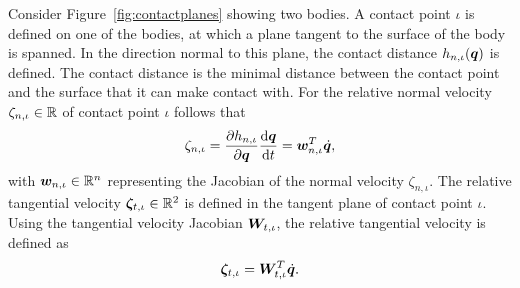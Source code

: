 \documentclass[../DC2017114Bouma.tex]{subfiles}
\begin{document}
Consider Figure~\ref{fig:contactplanes} showing two bodies. A contact point $\iota$ is defined on one of the bodies, at which a plane tangent to the surface of the body is spanned. In the direction normal to this plane, the contact distance $h_{n,\iota}({\boldsymbol{q}})$ is defined. The contact distance is the minimal distance between the contact point and the surface that it can make contact with. For the relative normal velocity $\zeta_{n,\iota}\in\mathbb{R}$ of contact point $\iota$ follows that
\begin{align}
\zeta_{n,\iota} = \frac{\partial h_{n,\iota}}{\partial{\boldsymbol{q}}}\frac{\text{d}{\boldsymbol{q}}}{\text{d} t} = {\boldsymbol{w}}_{n,\iota}^T\dot{{\boldsymbol{q}}},
\end{align}
%
%
%
%
%
%
%
%
%
%
%
%
%
%
%
%
%
%
%
%
with ${\boldsymbol{w}}_{n,\iota}\in\mathbb{R}^n$ representing the Jacobian of the normal velocity $\zeta_{n,\iota}$. The relative tangential velocity $\boldsymbol{\zeta}_{t,\iota}\in\mathbb{R}^2$ is defined in the tangent plane of contact point $\iota$. Using the tangential velocity Jacobian ${\boldsymbol{W}}_{t,\iota}$, the relative tangential velocity is defined as
\begin{align}
\boldsymbol{\zeta}_{t,\iota} = {\boldsymbol{W}}_{t,\iota}^T\dot{{\boldsymbol{q}}}.
\end{align}
\end{document}
